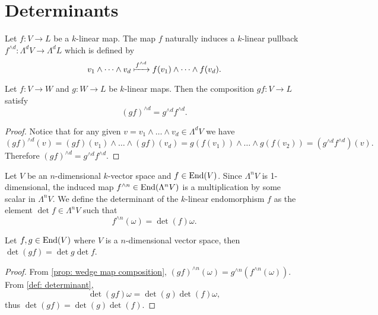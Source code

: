 \section{Determinants}

\begin{definition}\label{def: wedge map}
    Let \(f: V \to L\) be a \(k\)-linear map. The map \(f\) naturally induces a
    \(k\)-linear pullback \(f^{\wedge d}: \Lambda^d V \to \Lambda^d L\) which is
    defined by
    \[
        v_1 \wedge \dots \wedge v_d \xmapsto{f^{\wedge d}}
        f(v_1) \wedge \dots \wedge f(v_d).
    \]
\end{definition}

\begin{proposition}\label{prop: wedge map composition}
    Let \(f: V \to W\) and \(g: W \to L\) be \(k\)-linear maps. Then the
    composition \(g f: V \to L\) satisfy
    \[
        (g f)^{\wedge d} = g^{\wedge d} f^{\wedge d}.
    \]
\end{proposition}

\begin{proof}
    Notice that for any given \(v = v_1 \wedge \dots \wedge v_d \in \Lambda^d V\)
    we have
    \[
        (g f)^{\wedge d}(v) = (g f) (v_1) \wedge \dots \wedge (g f) (v_d)
        = g(f(v_1)) \wedge \dots \wedge g(f(v_2))
        = (g^{\wedge d} f^{\wedge d})(v).
    \]
    Therefore \((g f)^{\wedge d} = g^{\wedge d} f^{\wedge d}\).
\end{proof}

\begin{definition}[Determinant]\label{def: determinant}
    Let \(V\) be an \(n\)-dimensional \(k\)-vector space and \(f \in \operatorname{End}(V)\).
    Since \(\Lambda^n V\) is 1-dimensional, the induced map \(f^{\wedge n}
    \in \operatorname{End}(\Lambda^n V)\) is a multiplication by some scalar in
    \(\Lambda^n V\).  We define the determinant of the \(k\)-linear endomorphism
    \(f\) as the element \(\det f \in \Lambda^n V\) such that
    \[
        f^{\wedge n}(\omega) = \det(f) \omega.
    \]
\end{definition}

\begin{proposition}\label{prop: comp det}
    Let \(f, g \in \operatorname{End}(V)\) where \(V\) is a \(n\)-dimensional vector space, then
    \(\det(g f) = \det g \det f\).
\end{proposition}

\begin{proof}
    From \cref{prop: wedge map composition}, \((g f)^{\wedge n}(\omega) =
    g^{\wedge n}(f^{\wedge n}(\omega))\). From \cref{def: determinant},
    \[
        \det(g f) \omega = \det(g) \det(f) \omega,
    \]
    thus \(\det(g f) = \det(g) \det(f)\).
\end{proof}


